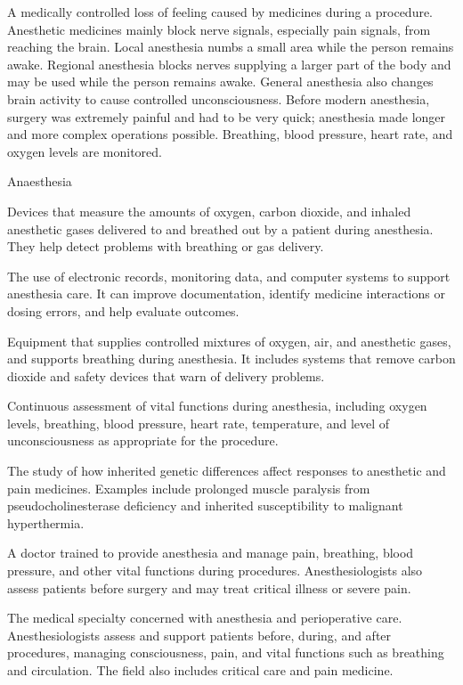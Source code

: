  A medically controlled loss of feeling caused by medicines during a procedure. Anesthetic medicines mainly block nerve signals, especially pain signals, from reaching the brain. Local anesthesia numbs a small area while the person remains awake. Regional anesthesia blocks nerves supplying a larger part of the body and may be used while the person remains awake. General anesthesia also changes brain activity to cause controlled unconsciousness. Before modern anesthesia, surgery was extremely painful and had to be very quick; anesthesia made longer and more complex operations possible. Breathing, blood pressure, heart rate, and oxygen levels are monitored.

\synonyms
Anaesthesia

 Devices that measure the amounts of oxygen, carbon dioxide, and inhaled anesthetic gases delivered to and breathed out by a patient during anesthesia. They help detect problems with breathing or gas delivery.

 The use of electronic records, monitoring data, and computer systems to support anesthesia care. It can improve documentation, identify medicine interactions or dosing errors, and help evaluate outcomes.

 Equipment that supplies controlled mixtures of oxygen, air, and anesthetic gases, and supports breathing during anesthesia. It includes systems that remove carbon dioxide and safety devices that warn of delivery problems.

 Continuous assessment of vital functions during anesthesia, including oxygen levels, breathing, blood pressure, heart rate, temperature, and level of unconsciousness as appropriate for the procedure.

 The study of how inherited genetic differences affect responses to anesthetic and pain medicines. Examples include prolonged muscle paralysis from pseudocholinesterase deficiency and inherited susceptibility to malignant hyperthermia.

 A doctor trained to provide anesthesia and manage pain, breathing, blood pressure, and other vital functions during procedures. Anesthesiologists also assess patients before surgery and may treat critical illness or severe pain.

 The medical specialty concerned with anesthesia and perioperative care. Anesthesiologists
assess and support patients before, during, and after procedures, managing consciousness,
pain, and vital functions such as breathing and circulation. The field also includes critical
care and pain medicine.

